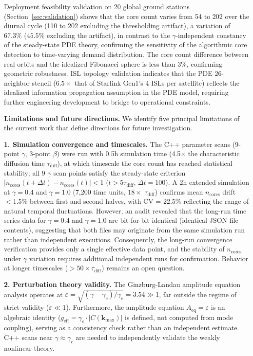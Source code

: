 \documentclass[sn-nature,pdflatex]{sn-jnl}
\begin{document}
Deployment feasibility validation on 20 global ground stations (Section~\ref{sec:validation}) shows that the core count varies from 54 to 202 over the diurnal cycle (110 to 202 excluding the thresholding artifact), a variation of $67.3\%$ ($45.5\%$ excluding the artifact), in contrast to the $\gamma$-independent constancy of the steady-state PDE theory, confirming the sensitivity of the algorithmic core detection to time-varying demand distribution. The core count difference between real orbits and the idealized Fibonacci sphere is less than $3\%$, confirming geometric robustness. ISL topology validation indicates that the PDE 26-neighbor stencil ($6.5\times$ that of Starlink Gen1's 4 ISLs per satellite) reflects the idealized information propagation assumption in the PDE model, requiring further engineering development to bridge to operational constraints.

\bigskip\noindent\textbf{Limitations and future directions.}
We identify five principal limitations of the current work that define directions for future investigation.

\textbf{1. Simulation convergence and timescales.} The C++ parameter scans (9-point $\gamma$, 3-point $\beta$) were run with 0.5h simulation time (4.5$\times$ the characteristic diffusion time $\tau_{\text{diff}}$), at which timescale the core count has reached statistical stability; all 9 $\gamma$ scan points satisfy the steady-state criterion $|n_{\text{cores}}(t + \Delta t) - n_{\text{cores}}(t)| < 1$ ($t > 5\tau_{\text{diff}}$, $\Delta t = 100$). A 2h extended simulation at $\gamma = 0.4$ and $\gamma = 1.0$ (7,200 time units, $18\times$ $\tau_{\text{diff}}$) confirms mean $n_{\text{cores}}$ drift $<1.5\%$ between first and second halves, with CV = 22.5\% reflecting the range of natural temporal fluctuations. However, an audit revealed that the long-run time series data for $\gamma = 0.4$ and $\gamma = 1.0$ are bit-for-bit identical (identical JSON file contents), suggesting that both files may originate from the same simulation run rather than independent executions. Consequently, the long-run convergence verification provides only a single effective data point, and the stability of $n_{\text{cores}}$ under $\gamma$ variation requires additional independent runs for confirmation. Behavior at longer timescales ($>50\times \tau_{\text{diff}}$) remains an open question.

\textbf{2. Perturbation theory validity.}
The Ginzburg-Landau amplitude equation analysis operates at $\varepsilon = \sqrt{(\gamma-\gamma_c)/\gamma_c} = 3.54 \gg 1$, far outside the regime of strict validity ($\varepsilon \ll 1$).
Furthermore, the amplitude equation $A_{\text{eq}} = \varepsilon$ is an algebraic identity ($g_{\text{eff}} = \gamma_c \cdot |C(\mathbf{k}_{\max})|$ is defined, not computed from mode coupling), serving as a consistency check rather than an independent estimate.
C++ scans near $\gamma \approx \gamma_c$ are needed to independently validate the weakly nonlinear theory.
\end{document}
